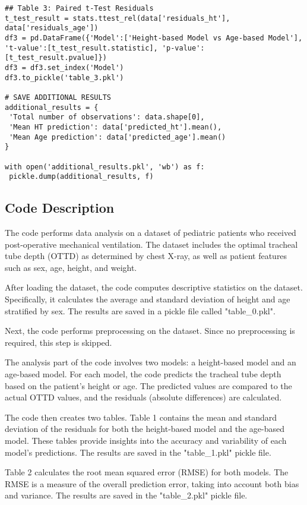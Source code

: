 \documentclass[11pt]{article}
\begin{document}
\begin{verbatim}
## Table 3: Paired t-Test Residuals
t_test_result = stats.ttest_rel(data['residuals_ht'], data['residuals_age'])
df3 = pd.DataFrame({'Model':['Height-based Model vs Age-based Model'], 't-value':[t_test_result.statistic], 'p-value':[t_test_result.pvalue]})
df3 = df3.set_index('Model')
df3.to_pickle('table_3.pkl')

# SAVE ADDITIONAL RESULTS
additional_results = {
 'Total number of observations': data.shape[0],
 'Mean HT prediction': data['predicted_ht'].mean(),
 'Mean Age prediction': data['predicted_age'].mean()
}

with open('additional_results.pkl', 'wb') as f:
 pickle.dump(additional_results, f)

\end{verbatim}

\subsection{Code Description}

The code performs data analysis on a dataset of pediatric patients who received post-operative mechanical ventilation. The dataset includes the optimal tracheal tube depth (OTTD) as determined by chest X-ray, as well as patient features such as sex, age, height, and weight.

After loading the dataset, the code computes descriptive statistics on the dataset. Specifically, it calculates the average and standard deviation of height and age stratified by sex. The results are saved in a pickle file called "table\_0.pkl".

Next, the code performs preprocessing on the dataset. Since no preprocessing is required, this step is skipped.

The analysis part of the code involves two models: a height-based model and an age-based model. For each model, the code predicts the tracheal tube depth based on the patient's height or age. The predicted values are compared to the actual OTTD values, and the residuals (absolute differences) are calculated.

The code then creates two tables. Table 1 contains the mean and standard deviation of the residuals for both the height-based model and the age-based model. These tables provide insights into the accuracy and variability of each model's predictions. The results are saved in the "table\_1.pkl" pickle file.

Table 2 calculates the root mean squared error (RMSE) for both models. The RMSE is a measure of the overall prediction error, taking into account both bias and variance. The results are saved in the "table\_2.pkl" pickle file.
\end{document}
